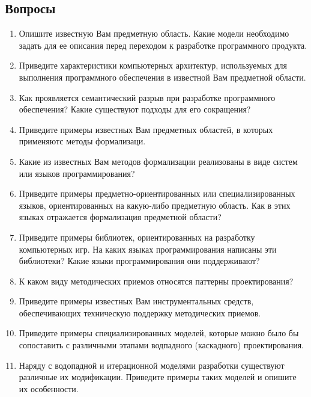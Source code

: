 \subsection{Вопросы}

\begin{enumerate}
    \item Опишите известную Вам предметную область. Какие модели необходимо задать для ее описания перед переходом к разработке программного продукта.
    \item Приведите характеристики компьютерных архитектур, используемых для выполнения программного обеспечения в известной Вам предметной области.
    \item Как проявляется семантический разрыв при разработке программного обеспечения? Какие существуют подходы для его сокращения?
    \item Приведите примеры известных Вам предметных областей, в которых применяютс методы формализаци.
    \item Какие из известных Вам методов формализации реализованы в виде систем или языков программирования?
    \item Приведите примеры предметно-ориентированных или специализированных языков, ориентированных на какую-либо предметную область. Как в этих языках отражается формализация предметной области?
    \item Приведите примеры библиотек, ориентированных на разработку компьютерных игр. На каких языках программирования написаны эти библиотеки? Какие языки программирования они поддерживают?
    \item К каком виду методических приемов относятся паттерны проектирования?
    \item Приведите примеры известных Вам инструментальных средств, обеспечивающих техническую поддержку методических приемов.
    \item Приведите примеры специализированных моделей, которые можно было бы сопоставить с различными этапами водпадного (каскадного) проектирования.
    \item Наряду с водопадной и итерационной моделями разработки существуют различные их модификации. Приведите примеры таких моделей и опишите их особенности.
\end{enumerate}


